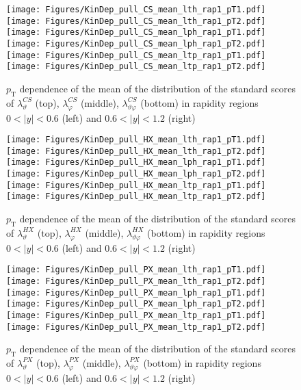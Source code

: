 \documentclass[12pt]{article}
\newcommand{\pT}{p_\mathrm{T}}
\newcommand{\absy}{\left |  y \right |}
\newcommand{\lamthCS}{\lambda^{\scriptscriptstyle CS}_\vartheta}
\newcommand{\lamphCS}{\lambda^{\scriptscriptstyle CS}_\varphi}
\newcommand{\lamthphCS}{\lambda^{\scriptscriptstyle CS}_{\vartheta \varphi}}
\newcommand{\lamthHX}{\lambda^{\scriptscriptstyle HX}_\vartheta}
\newcommand{\lamphHX}{\lambda^{\scriptscriptstyle HX}_\varphi}
\newcommand{\lamthphHX}{\lambda^{\scriptscriptstyle HX}_{\vartheta \varphi}}
\newcommand{\lamthPX}{\lambda^{\scriptscriptstyle PX}_\vartheta}
\newcommand{\lamphPX}{\lambda^{\scriptscriptstyle PX}_\varphi}
\newcommand{\lamthphPX}{\lambda^{\scriptscriptstyle PX}_{\vartheta \varphi}}
\begin{document}


\begin{figure}[htbp]
\centering
\texttt{[image: Figures/KinDep\_pull\_CS\_mean\_lth\_rap1\_pT1.pdf]}
\texttt{[image: Figures/KinDep\_pull\_CS\_mean\_lth\_rap1\_pT2.pdf]}
\texttt{[image: Figures/KinDep\_pull\_CS\_mean\_lph\_rap1\_pT1.pdf]}
\texttt{[image: Figures/KinDep\_pull\_CS\_mean\_lph\_rap1\_pT2.pdf]}
\texttt{[image: Figures/KinDep\_pull\_CS\_mean\_ltp\_rap1\_pT1.pdf]}
\texttt{[image: Figures/KinDep\_pull\_CS\_mean\_ltp\_rap1\_pT2.pdf]}
\caption{$\pT$ dependence of the mean of the distribution of the standard scores
of $\lamthCS$ (top), $\lamphCS$ (middle), $\lamthphCS$ (bottom) in rapidity
regions $0<\absy<0.6$ (left) and $0.6<\absy<1.2$ (right)}
\end{figure}
\clearpage

\begin{figure}[htbp]
\centering
\texttt{[image: Figures/KinDep\_pull\_HX\_mean\_lth\_rap1\_pT1.pdf]}
\texttt{[image: Figures/KinDep\_pull\_HX\_mean\_lth\_rap1\_pT2.pdf]}
\texttt{[image: Figures/KinDep\_pull\_HX\_mean\_lph\_rap1\_pT1.pdf]}
\texttt{[image: Figures/KinDep\_pull\_HX\_mean\_lph\_rap1\_pT2.pdf]}
\texttt{[image: Figures/KinDep\_pull\_HX\_mean\_ltp\_rap1\_pT1.pdf]}
\texttt{[image: Figures/KinDep\_pull\_HX\_mean\_ltp\_rap1\_pT2.pdf]}
\caption{$\pT$ dependence of the mean of the distribution of the standard scores
of $\lamthHX$ (top), $\lamphHX$ (middle), $\lamthphHX$ (bottom) in rapidity
regions $0<\absy<0.6$ (left) and $0.6<\absy<1.2$ (right)}
\end{figure}
\clearpage

\begin{figure}[htbp]
\centering
\texttt{[image: Figures/KinDep\_pull\_PX\_mean\_lth\_rap1\_pT1.pdf]}
\texttt{[image: Figures/KinDep\_pull\_PX\_mean\_lth\_rap1\_pT2.pdf]}
\texttt{[image: Figures/KinDep\_pull\_PX\_mean\_lph\_rap1\_pT1.pdf]}
\texttt{[image: Figures/KinDep\_pull\_PX\_mean\_lph\_rap1\_pT2.pdf]}
\texttt{[image: Figures/KinDep\_pull\_PX\_mean\_ltp\_rap1\_pT1.pdf]}
\texttt{[image: Figures/KinDep\_pull\_PX\_mean\_ltp\_rap1\_pT2.pdf]}
\caption{$\pT$ dependence of the mean of the distribution of the standard scores
of $\lamthPX$ (top), $\lamphPX$ (middle), $\lamthphPX$ (bottom) in rapidity
regions $0<\absy<0.6$ (left) and $0.6<\absy<1.2$ (right)}
\end{figure}
\clearpage
\end{document}
